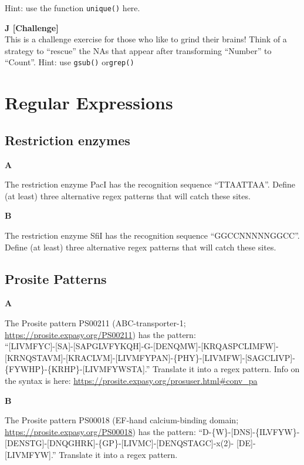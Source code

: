 \documentclass[]{book}
\begin{document}
Hint: use the function \texttt{unique()} here.

\textbf{J {[}Challenge{]}}\\
This is a challenge exercise for those who like to grind their brains! Think of a strategy to ``rescue'' the NAs that appear after transforming ``Number'' to ``Count''. Hint: use \texttt{gsub()} or\texttt{grep()}

\hypertarget{regular-expressions}{%
\section{Regular Expressions}\label{regular-expressions}}

\hypertarget{restriction-enzymes}{%
\subsection{Restriction enzymes}\label{restriction-enzymes}}

\textbf{A}

The restriction enzyme PacI has the recognition sequence ``TTAATTAA''. Define (at least) three alternative regex patterns that will catch these sites.

\textbf{B}

The restriction enzyme SfiI has the recognition sequence ``GGCCNNNNNGGCC''. Define (at least) three alternative regex patterns that will catch these sites.

\hypertarget{prosite-patterns}{%
\subsection{Prosite Patterns}\label{prosite-patterns}}

\textbf{A}

The Prosite pattern PS00211 (ABC-transporter-1; \url{https://prosite.expasy.org/PS00211}) has the pattern:\\
``{[}LIVMFYC{]}-{[}SA{]}-{[}SAPGLVFYKQH{]}-G-{[}DENQMW{]}-{[}KRQASPCLIMFW{]}-{[}KRNQSTAVM{]}-{[}KRACLVM{]}-{[}LIVMFYPAN{]}-\{PHY\}-{[}LIVMFW{]}-{[}SAGCLIVP{]}-\{FYWHP\}-\{KRHP\}-{[}LIVMFYWSTA{]}.''
Translate it into a regex pattern. Info on the syntax is here: \url{https://prosite.expasy.org/prosuser.html\#conv_pa}

\textbf{B}

The Prosite pattern PS00018 (EF-hand calcium-binding domain; \url{https://prosite.expasy.org/PS00018}) has the pattern:
``D-\{W\}-{[}DNS{]}-\{ILVFYW\}-{[}DENSTG{]}-{[}DNQGHRK{]}-\{GP\}-{[}LIVMC{]}-{[}DENQSTAGC{]}-x(2)- {[}DE{]}-{[}LIVMFYW{]}.''
Translate it into a regex pattern.
\end{document}
